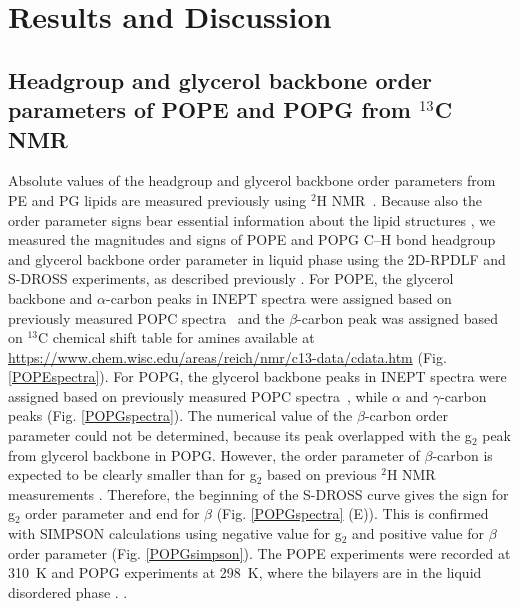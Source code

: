 \documentclass[aps,prl,superscriptaddress,twocolumn]{revtex4}
\begin{document}
\clearpage
\section{Results and Discussion}

\subsection{Headgroup and glycerol backbone order parameters of POPE and POPG from $^{13}$C NMR}
Absolute values of the headgroup and glycerol backbone order parameters from PE and PG lipids are measured
previously using $^2$H NMR~\cite{seelig76,gally81,wohlgemuth80,borle85}. Because also the order parameter
signs bear essential information about the lipid structures \cite{botan15,ollila16}, we measured the
magnitudes and signs of POPE and POPG C--H bond headgroup and glycerol backbone order parameter in liquid phase
using the 
2D-RPDLF and S-DROSS experiments, as described previously \cite{ferreira13,ferreira16,antila19}.
For POPE, the glycerol backbone and $\alpha$-carbon peaks in INEPT spectra were assigned based on
previously measured POPC spectra~\cite{ferreira13} and
the $\beta$-carbon peak was assigned based on $^{13}$C chemical shift table for amines available
at \url{https://www.chem.wisc.edu/areas/reich/nmr/c13-data/cdata.htm} (Fig. \ref{POPEspectra}).
For POPG, the glycerol backbone peaks in INEPT spectra were assigned based on
previously measured POPC spectra~\cite{ferreira13}, while $\alpha$ and  $\gamma$-carbon peaks
 (Fig. \ref{POPGspectra}). The numerical value of the $\beta$-carbon
order parameter could not be determined, because its peak overlapped with the g$_2$ peak from glycerol backbone in POPG.
However, the order parameter of $\beta$-carbon is expected to be clearly smaller than for g$_2$
based on previous $^2$H NMR measurements \cite{wohlgemuth80,gally81,borle85}.
Therefore, the beginning of the S-DROSS curve gives the sign for g$_2$ order parameter and end for $\beta$ (Fig. \ref{POPGspectra} (E)).
This is confirmed with SIMPSON calculations using negative value for g$_2$ and positive value for $\beta$ order parameter (Fig. \ref{POPGsimpson}).
The POPE experiments were recorded at 310~K and POPG experiments at 298~K, where the bilayers are in the liquid disordered phase \cite{marsh13}.
.
\end{document}
